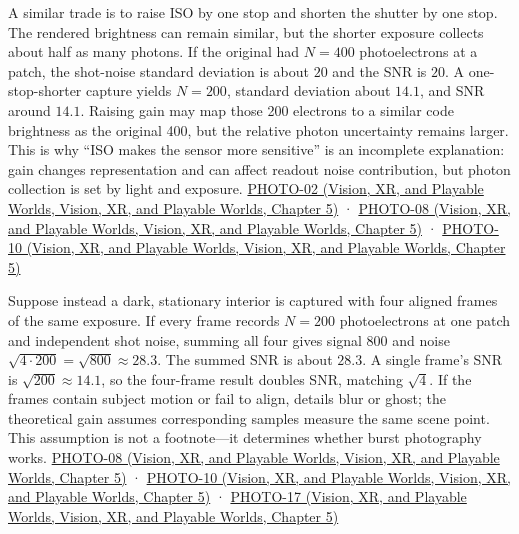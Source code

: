 A similar trade is to raise ISO by one stop and shorten the shutter by one stop. The rendered brightness can remain similar, but the shorter exposure collects about half as many photons. If the original had \(N=400\) photoelectrons at a patch, the shot-noise standard deviation is about \(20\) and the SNR is \(20\). A one-stop-shorter capture yields \(N=200\), standard deviation about \(14.1\), and SNR around \(14.1\). Raising gain may map those 200 electrons to a similar code brightness as the original 400, but the relative photon uncertainty remains larger. This is why ``ISO makes the sensor more sensitive'' is an incomplete explanation: gain changes representation and can affect readout noise contribution, but photon collection is set by light and exposure. \href{../07-Vision-XR-and-Playable-Worlds/main.pdf\#nameddest=04-visual-computing-ii-ch036-photo-02---photography-session-02}{PHOTO-02 (Vision, XR, and Playable Worlds, Vision, XR, and Playable Worlds, Chapter 5)} · \href{../07-Vision-XR-and-Playable-Worlds/main.pdf\#nameddest=04-visual-computing-ii-ch036-photo-08---photography-session-08}{PHOTO-08 (Vision, XR, and Playable Worlds, Vision, XR, and Playable Worlds, Chapter 5)} · \href{../07-Vision-XR-and-Playable-Worlds/main.pdf\#nameddest=04-visual-computing-ii-ch036-photo-10---photography-session-10}{PHOTO-10 (Vision, XR, and Playable Worlds, Vision, XR, and Playable Worlds, Chapter 5)}

Suppose instead a dark, stationary interior is captured with four aligned frames of the same exposure. If every frame records \(N=200\) photoelectrons at one patch and independent shot noise, summing all four gives signal \(800\) and noise \(\sqrt{4\cdot200}=\sqrt{800}\approx28.3\). The summed SNR is about \(28.3\). A single frame's SNR is \(\sqrt{200}\approx14.1\), so the four-frame result doubles SNR, matching \(\sqrt4\). If the frames contain subject motion or fail to align, details blur or ghost; the theoretical gain assumes corresponding samples measure the same scene point. This assumption is not a footnote---it determines whether burst photography works. \href{../07-Vision-XR-and-Playable-Worlds/main.pdf\#nameddest=04-visual-computing-ii-ch036-photo-08---photography-session-08}{PHOTO-08 (Vision, XR, and Playable Worlds, Vision, XR, and Playable Worlds, Chapter 5)} · \href{../07-Vision-XR-and-Playable-Worlds/main.pdf\#nameddest=04-visual-computing-ii-ch036-photo-10---photography-session-10}{PHOTO-10 (Vision, XR, and Playable Worlds, Vision, XR, and Playable Worlds, Chapter 5)} · \href{../07-Vision-XR-and-Playable-Worlds/main.pdf\#nameddest=04-visual-computing-ii-ch036-photo-17---photography-session-17}{PHOTO-17 (Vision, XR, and Playable Worlds, Vision, XR, and Playable Worlds, Chapter 5)}


